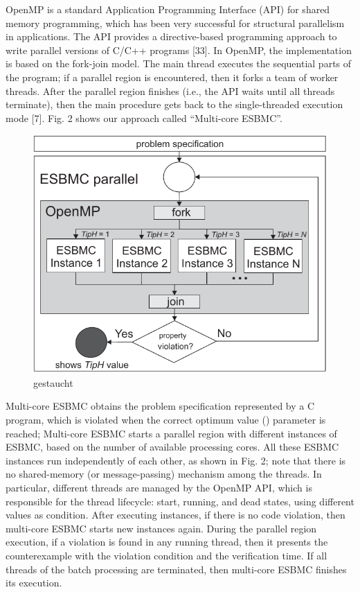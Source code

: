 OpenMP is a standard Application Programming Interface (API) for shared memory programming, which has been very successful for structural parallelism in applications. The API provides a directive-based programming approach to write parallel versions of C/C++ programs [33]. In OpenMP, the implementation is based on the fork-join model. The main thread executes the sequential parts of the program; if a parallel region is encountered, then it forks a team of worker threads. After the parallel region finishes (i.e., the API waits until all threads terminate), then the main procedure gets back to the single-threaded execution mode [7]. Fig. 2 shows our approach called “Multi-core ESBMC”.
\begin{figure}[ht]
	\centering
  \includegraphics[scale=0.75]{Image/esbmc-parallel.pdf} 
	\caption{gestaucht}
\end{figure}

Multi-core ESBMC obtains the problem specification represented by a C program, which is violated when the correct optimum value () parameter is reached; Multi-core ESBMC starts a parallel region with  different instances of ESBMC, based on the number of available processing cores. All these ESBMC instances run independently of each other, as shown in Fig. 2; note that there is no shared-memory (or message-passing) mechanism among the threads. In particular, different threads are managed by the OpenMP API, which is responsible for the thread lifecycle: start, running, and dead states, using different  values as condition. After executing  instances, if there is no code violation, then multi-core ESBMC starts  new instances again. During the parallel region execution, if a violation is found in any running thread, then it presents the counterexample with the violation condition and the verification time. If all threads of the batch processing are terminated, then multi-core ESBMC finishes its execution.

